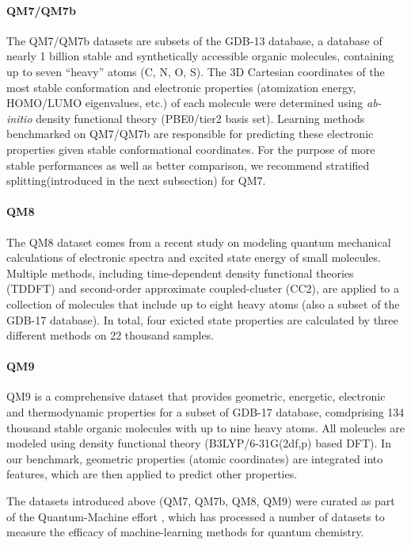 \paragraph{QM7/QM7b}

The QM7/QM7b datasets are subsets of the GDB-13 database\cite{GDB13}, a database of nearly 1 billion stable and synthetically accessible organic molecules, containing up to seven ``heavy'' atoms (C, N, O, S). The 3D Cartesian coordinates of the most stable conformation and electronic properties (atomization energy, HOMO/LUMO eigenvalues, etc.) of each molecule were determined using \textit{ab-initio} density functional theory (PBE0/tier2 basis set).\cite{GDB7_dataset_prl, GDB7_dataset_arxiv} Learning methods benchmarked on QM7/QM7b are responsible for predicting these electronic properties given stable conformational coordinates. For the purpose of more stable performances as well as better comparison, we recommend stratified splitting(introduced in the next subsection) for QM7.

\paragraph{QM8}

The QM8 dataset comes from a recent study on modeling quantum mechanical calculations of electronic spectra and excited state energy of small molecules.\cite{QM8} Multiple methods, including time-dependent density functional theories (TDDFT) and second-order approximate coupled-cluster (CC2), are applied to a collection of molecules that include up to eight heavy atoms (also a subset of the GDB-17 database\cite{GDB-17}). In total, four exicted state properties are calculated by three different methods on 22 thousand samples.

\paragraph{QM9}

QM9 is a comprehensive dataset that provides geometric, energetic, electronic and thermodynamic properties for a subset of GDB-17 database\cite{GDB-17}, comdprising 134 thousand stable organic molecules with up to nine heavy atoms\cite{QM9}. All moleucles are modeled using density functional theory (B3LYP/6-31G(2df,p) based DFT). In our benchmark, geometric properties (atomic coordinates) are integrated into features, which are then applied to predict other properties.

The datasets introduced above (QM7, QM7b, QM8, QM9) were curated as part of the Quantum-Machine effort \cite{QuantumMachine}, which has processed a number of datasets to measure the efficacy of machine-learning methods for quantum chemistry.

